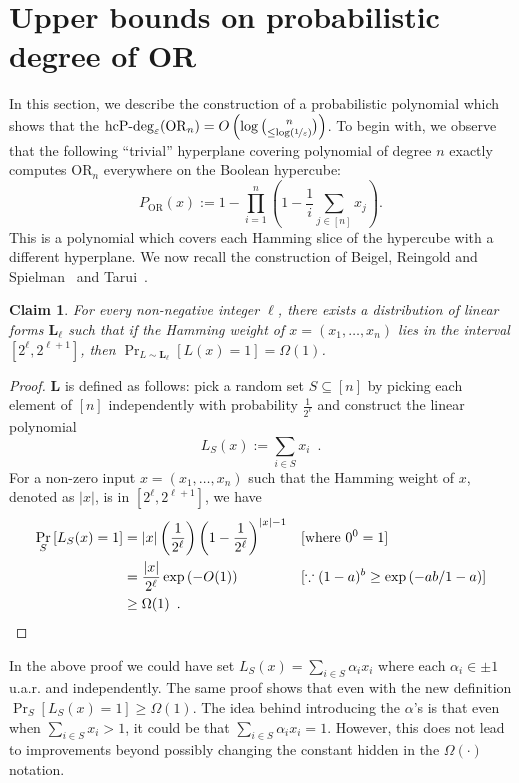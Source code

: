 \documentclass[10pt,a4paper]{article}
\theoremstyle{plain}
\newtheorem{claim}[theorem]{Claim}
\theoremstyle{definition}
\renewcommand{\epsilon}{\varepsilon}
\newcommand{\eps}{\epsilon}
\newcommand{\OR}{\mathrm{OR}}
\newcommand{\hcpdeg}{\operatorname{hcP-deg}}
\newcommand{\distL}{\mathbf{L}}
\newcommand{\prob}[2]{\Pr_{#1}\left[ #2 \right]}
\newcommand{\cbra}[1]{\left(#1\right)}
\newcommand{\bigo}[1]{O\left(#1\right)}
\newcommand{\lepsinv}{\log(\nicefrac1\eps)}
\newcommand{\bigomega}[1]{\Omega\cbra{#1}}
\begin{document}
\section{Upper bounds on probabilistic degree of OR}\label{sec:upper}
    In this section, we describe the construction of a probabilistic polynomial 
which shows that the  $\hcpdeg_\eps(\OR_n) = \bigo{\log \binom{n}{\leq \lepsinv}}$.
  To begin with, we observe that the following
``trivial'' hyperplane covering polynomial of degree $n$ exactly computes $\OR_n$
everywhere on the Boolean hypercube:
\[
P_{\OR}(x) := 1- \prod_{i =1}^n \cbra{1- \frac1i\sum_{j \in [n]} x_j}.
\]
This is a polynomial which covers each Hamming slice of the hypercube
with a different hyperplane. 
We now recall the construction of Beigel, Reingold and
Spielman~\cite{BeigelRS1991} and Tarui~\cite{Tarui1993}. 
\begin{claim}For every non-negative integer $\ell$, there exists a distribution of linear forms $\distL_\ell$  such that if
the Hamming weight of $x = (x_1,\ldots,x_n)$ lies in the interval
$[2^\ell, 2^{\ell+1}]$, then $\prob{L \sim \distL_\ell}{L(x) = 1} =
\bigomega{1}$.
\end{claim}
\begin{proof}
    $\distL$ is defined as follows: pick a random set $S \subseteq [n]$ by picking each element of $[n]$ independently with probability $\frac{1}{2^{\ell}}$ and construct the linear polynomial 
    \[L_S(x) := \sum_{i \in S} x_i\enspace.\]
    For a non-zero input $x = (x_1,\ldots,x_n)$ such that the Hamming weight of $x$, denoted as $|x|$, is in $[2^\ell, 2^{\ell+1}]$, we have
        \begin{align*}
            \prob{S}{L_S(x) = 1} &= |x|\cbra{\frac{1}{2^\ell}} \cbra{1-\frac{1}{2^\ell}}^{|x|-1}&&[\text{where\ }0^0=1]\\
                    &= \frac{|x|}{2^\ell} \exp{(-O(1))}&&[\because (1-a)^b\geq \exp{(-ab/1-a)}]\\
                    &\geq  \Omega(1)\enspace.\qedhere
        \end{align*}
\end{proof}

In the above proof we could have set $L_S(x)=\sum_{i\in S}\alpha_i
x_i$ where each $\alpha_i\in \pm1$ u.a.r. and independently. The same proof shows that
even with the new definition $\prob{S}{L_S(x) = 1}\geq \Omega(1)$. The
idea behind introducing the $\alpha$'s is that even when $\sum_{i\in S}x_i>1$, it could be that $\sum_{i\in S}\alpha_i x_i=1$. However, this does not lead to improvements beyond possibly changing the constant hidden in the $\Omega(\cdot)$ notation.  
 
\end{document}
